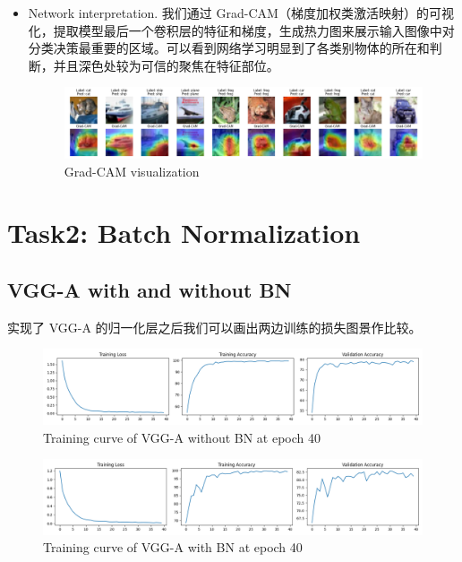 \documentclass[10pt]{ctexart}
\begin{document}
\begin{itemize}
	\item Network interpretation. ​​我们通过 Grad-CAM（梯度加权类激活映射）​​的可视化，提取模型最后一个卷积层的特征和梯度，生成热力图来展示输入图像中对分类决策最重要的区域。可以看到网络学习明显到了各类别物体的所在和判断，并且深色处较为可信的聚焦在特征部位。
	
	\begin{figure}[H]
		\centering
		\includegraphics[width=1.1\linewidth]{grad_cam.png}
		\caption{Grad-CAM visualization}
	\end{figure}
\end{itemize}                        


\section{Task2: Batch Normalization}
\subsection{VGG-A with and without BN}
实现了 VGG-A 的归一化层之后我们可以画出两边训练的损失图景作比较。

\begin{figure}[h]
	\centering
	\includegraphics[width=0.9\linewidth]{training_curve_epoch_40.png}
	\caption{Training curve of VGG-A without BN at epoch 40}
\end{figure}

\begin{figure}[h]
	\centering
	\includegraphics[width=0.9\linewidth]{training_curve_bn_epoch_40.png}
	\caption{Training curve of VGG-A with BN at epoch 40}
\end{figure}
\end{document}
